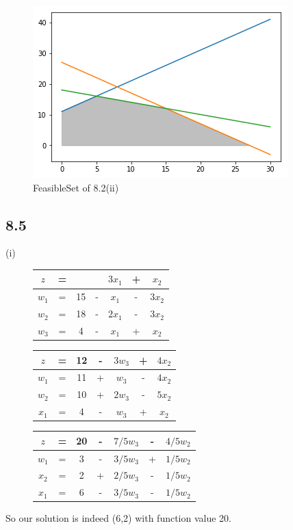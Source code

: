 \documentclass{article}
\begin{document}
	\begin{figure}[!h]
		\centering
		\includegraphics[scale = 0.5]{fig3}
		\caption{FeasibleSet of 8.2(ii)}
	\end{figure}
	
	\subsection*{8.5}
	
	(i)
	
	\begin{figure}[!h]
		\begin{tabular}{c c c c c c c}
			$z$ & = & & & $3x_1$ & + & $x_2$ \\
			\hline
			$w_1$ & = & 15 & - &$x_1$& - &$3x_2$ \\
			$w_2$ & = & 18 & - & $2x_1$ & - & $3x_2$ \\
			$w_3$ & = & 4 & - & $x_1$ & + & $x_2 $ \\
			\hline
		\end{tabular}
	\end{figure}
	
	\begin{figure}[!h]
		\begin{tabular}{c c c c c c c}
			$z$ & = &12 &- & $3w_3$ & + & $4x_2$ \\
			\hline
			$w_1$ & = & 11 & + &$w_3$& - &$4x_2$ \\
			$w_2$ & = & 10 & + & $2w_3$ & - & $5x_2$ \\
			$x_1$ & = & 4 & - & $w_3$ & + & $x_2 $ \\
			\hline
		\end{tabular}
	\end{figure}
	
	\begin{figure}[!h]
		\begin{tabular}{c c c c c c c}
			$z$ & = & 20 &- & $7/5 w_3$ &  - & $4/5 w_2$ \\
			\hline
			$w_1$ & = & 3 & - &$3/5 w_3$& + &$1/5 w_2$ \\
			$x_2$ & = & 2 & + & $2/5 w_3$ & - & $1/5 w_2$ \\
			$x_1$ & = & 6 & - & $3/5 w_3$ & - & $1/5 w_2 $ \\
			\hline
		\end{tabular}
	\end{figure}
	So our solution is indeed (6,2) with function value 20.
	
\end{document}
